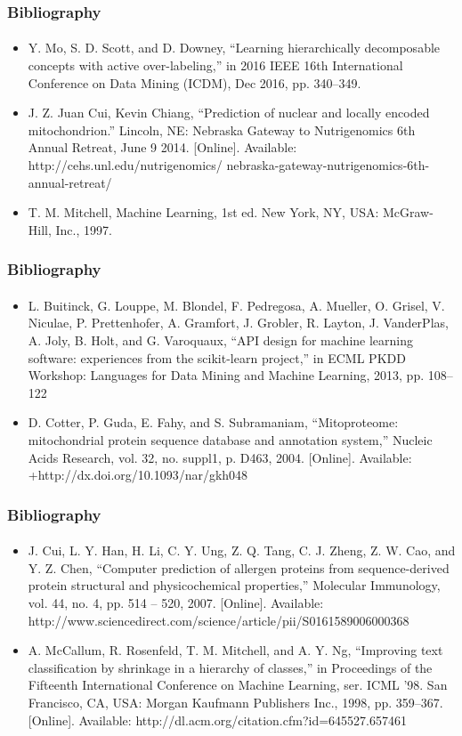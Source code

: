 \documentclass{beamer}
\begin{document}
\begin{frame}[noframenumbering]
    \frametitle{Bibliography}
    \framesubtitle{}
    \begin{itemize}
      \item Y. Mo, S. D. Scott, and D. Downey, “Learning hierarchically decomposable concepts with active over-labeling,” in 2016 IEEE 16th International Conference on Data Mining (ICDM), Dec 2016, pp. 340–349.
      \item J. Z. Juan Cui, Kevin Chiang, “Prediction of nuclear and locally encoded mitochondrion.” Lincoln, NE: Nebraska Gateway to Nutrigenomics 6th Annual Retreat, June 9 2014. [Online]. Available: http://cehs.unl.edu/nutrigenomics/ nebraska-gateway-nutrigenomics-6th-annual-retreat/
      \item T. M. Mitchell, Machine Learning, 1st ed. New York, NY, USA: McGraw-Hill, Inc., 1997.
    \end{itemize}
\end{frame}
\begin{frame}[noframenumbering]
    \frametitle{Bibliography}
    \framesubtitle{}
    \begin{itemize}
      \item L. Buitinck, G. Louppe, M. Blondel, F. Pedregosa, A. Mueller, O. Grisel, V. Niculae, P. Prettenhofer, A. Gramfort, J. Grobler, R. Layton, J. VanderPlas, A. Joly, B. Holt, and G. Varoquaux, “API design for machine learning software: experiences from the scikit-learn project,” in ECML PKDD Workshop: Languages for Data Mining and Machine Learning, 2013, pp. 108–122
      \item D. Cotter, P. Guda, E. Fahy, and S. Subramaniam, “Mitoproteome: mitochondrial protein sequence database and annotation system,” Nucleic Acids Research, vol. 32, no. suppl1, p. D463, 2004. [Online]. Available: +http://dx.doi.org/10.1093/nar/gkh048
    \end{itemize}
\end{frame}
\begin{frame}[noframenumbering]
    \frametitle{Bibliography}
    \framesubtitle{}
    \begin{itemize}
      \item J. Cui, L. Y. Han, H. Li, C. Y. Ung, Z. Q. Tang, C. J. Zheng, Z. W. Cao, and Y. Z. Chen, “Computer prediction of allergen proteins from sequence-derived protein structural and physicochemical properties,” Molecular Immunology, vol. 44, no. 4, pp. 514 – 520, 2007. [Online]. Available: http://www.sciencedirect.com/science/article/pii/S0161589006000368
      \item A. McCallum, R. Rosenfeld, T. M. Mitchell, and A. Y. Ng, “Improving text classification by shrinkage in a hierarchy of classes,” in Proceedings of the Fifteenth International Conference on Machine Learning, ser. ICML ’98. San Francisco, CA, USA: Morgan Kaufmann Publishers Inc., 1998, pp. 359–367. [Online]. Available: http://dl.acm.org/citation.cfm?id=645527.657461
    \end{itemize}
\end{frame}
\end{document}
